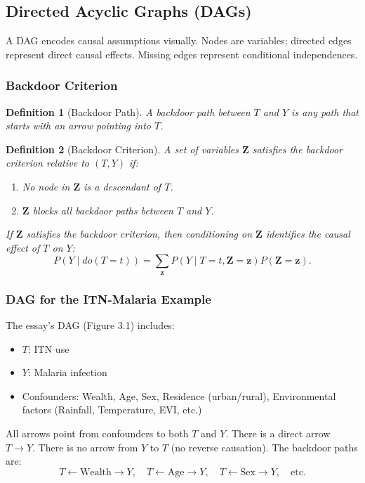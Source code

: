 \documentclass[12pt]{article}
\numberwithin{equation}{section}
\newtheorem{definition}{Definition}[section]
\begin{document}
	\subsection{Directed Acyclic Graphs (DAGs)}
	
	A DAG encodes causal assumptions visually. Nodes are variables; directed edges represent direct causal effects. Missing edges represent conditional independences.
	
	\subsubsection{Backdoor Criterion}
	
	\begin{definition}[Backdoor Path]
		A backdoor path between $T$ and $Y$ is any path that starts with an arrow pointing into $T$.
	\end{definition}
	
	\begin{definition}[Backdoor Criterion]
		A set of variables $\mathbf{Z}$ satisfies the backdoor criterion relative to $(T, Y)$ if:
		\begin{enumerate}
			\item No node in $\mathbf{Z}$ is a descendant of $T$.
			\item $\mathbf{Z}$ blocks all backdoor paths between $T$ and $Y$.
		\end{enumerate}
		If $\mathbf{Z}$ satisfies the backdoor criterion, then conditioning on $\mathbf{Z}$ identifies the causal effect of $T$ on $Y$:
		\[
		P(Y \mid do(T=t)) = \sum_{\mathbf{z}} P(Y \mid T=t, \mathbf{Z}=\mathbf{z}) P(\mathbf{Z}=\mathbf{z}).
		\]
	\end{definition}
	
	\subsubsection{DAG for the ITN-Malaria Example}
	
	The essay's DAG (Figure 3.1) includes:
	\begin{itemize}
		\item $T$: ITN use
		\item $Y$: Malaria infection
		\item Confounders: Wealth, Age, Sex, Residence (urban/rural), Environmental factors (Rainfall, Temperature, EVI, etc.)
	\end{itemize}
	
	All arrows point from confounders to both $T$ and $Y$. There is a direct arrow $T \to Y$. There is no arrow from $Y$ to $T$ (no reverse causation). The backdoor paths are:
	\[
	T \leftarrow \text{Wealth} \rightarrow Y,\quad T \leftarrow \text{Age} \rightarrow Y,\quad T \leftarrow \text{Sex} \rightarrow Y,\quad \text{etc.}
	\]
	
\end{document}
